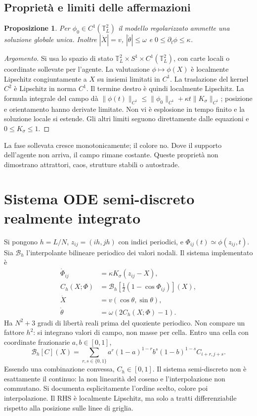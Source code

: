 \documentclass[11pt,a4paper]{article}
\newcommand{\T}{\mathbb{T}}
\newtheorem{proposition}{Proposizione}
\begin{document}
\subsection{Proprietà e limiti delle affermazioni}
\begin{proposition}
Per $\phi_0\in C^1(\T_L^2)$ il modello regolarizzato ammette una soluzione
globale unica. Inoltre $|\dot X|=v$, $|\dot\theta|\le\omega$ e
$0\le\partial_t\phi\le\kappa$.
\end{proposition}
\begin{proof}[Argomento]
Si usa lo spazio di stato $\T_L^2\times S^1\times C^1(\T_L^2)$,
con carte locali o coordinate sollevate per l'agente. La valutazione
$\phi\mapsto\phi(X)$ è localmente Lipschitz congiuntamente a $X$
su insiemi limitati in $C^1$. La traslazione del kernel $C^2$ è
Lipschitz in norma $C^1$. Il termine destro è quindi localmente Lipschitz.
La formula integrale del campo dà
$\|\phi(t)\|_{C^1}\le\|\phi_0\|_{C^1}
+\kappa t\|K_\sigma\|_{C^1}$; posizione e orientamento hanno derivate
limitate. Non vi è esplosione in tempo finito e la soluzione locale si estende.
Gli altri limiti seguono direttamente dalle equazioni e $0\le K_\sigma\le1$.
\end{proof}
La fase sollevata cresce monotonicamente; il colore no. Dove il supporto
dell'agente non arriva, il campo rimane costante. Queste proprietà non
dimostrano attrattori, caos, strutture stabili o autostrade.

\section{Sistema ODE semi-discreto realmente integrato}
Si pongono $h=L/N$, $z_{ij}=(ih,jh)$ con indici periodici, e
$\Phi_{ij}(t)\simeq\phi(z_{ij},t)$. Sia $\mathcal B_h$ l'interpolante
bilineare periodico dei valori nodali. Il sistema implementato è
\begin{align}
 \dot\Phi_{ij}&=\kappa K_\sigma(z_{ij}-X),\\
 C_h(X;\Phi)&=\mathcal B_h\left[\tfrac12(1-\cos\Phi_{ij})\right](X),\\
 \dot X&=v(\cos\theta,\sin\theta),\\
 \dot\theta&=\omega(2C_h(X;\Phi)-1).
\end{align}
Ha $N^2+3$ gradi di libertà reali prima del quoziente periodico.
Non compare un fattore $h^2$: si integrano valori di campo, non masse per
cella. Entro una cella con coordinate frazionarie $a,b\in[0,1]$,
\begin{equation}
 \mathcal B_h[C](X)=\sum_{r,s\in\{0,1\}}
 a^r(1-a)^{1-r}b^s(1-b)^{1-s}C_{i+r,j+s}.
\end{equation}
Essendo una combinazione convessa, $C_h\in[0,1]$.
Il sistema semi-discreto non è esattamente il continuo: la non linearità
del coseno e l'interpolazione non commutano. Si documenta esplicitamente
l'ordine scelto, colore poi interpolazione. Il RHS è localmente Lipschitz,
ma solo a tratti differenziabile rispetto alla posizione sulle linee di griglia.
\end{document}
